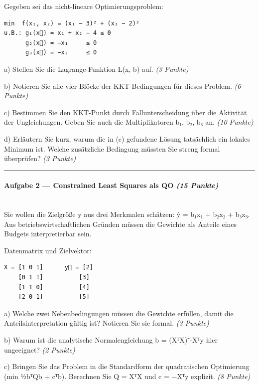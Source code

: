 \documentclass[11pt, a4paper]{article}
\begin{document}
Gegeben sei das nicht-lineare Optimierungsproblem:


\begin{lstlisting}
min  f(x₁, x₂) = (x₁ − 3)² + (x₂ − 2)²
u.B.: g₁(x⃗) = x₁ + x₂ − 4 ≤ 0
      g₂(x⃗) = −x₁     ≤ 0
      g₃(x⃗) = −x₂     ≤ 0
\end{lstlisting}


a) Stellen Sie die Lagrange-Funktion L(x⃗, b⃗) auf. \textit{(3 Punkte)}


b) Notieren Sie alle vier Blöcke der KKT-Bedingungen für dieses Problem. \textit{(6 Punkte)}


c) Bestimmen Sie den KKT-Punkt durch Fallunterscheidung über die Aktivität der Ungleichungen. Geben Sie auch die Multiplikatoren b₁, b₂, b₃ an. \textit{(10 Punkte)}


d) Erläutern Sie kurz, warum die in (c) gefundene Lösung tatsächlich ein lokales Minimum ist. Welche zusätzliche Bedingung müssten Sie streng formal überprüfen? \textit{(3 Punkte)}



\noindent\textcolor{rulegray}{\rule{\linewidth}{0.4pt}}


\paragraph{Aufgabe 2 — Constrained Least Squares als QO \textit{(15 Punkte)}}\mbox{}\\[2pt]

Sie wollen die Zielgröße y aus drei Merkmalen schätzen: ŷ = b₁x₁ + b₂x₂ + b₃x₃. Aus betriebswirtschaftlichen Gründen müssen die Gewichte als Anteile eines Budgets interpretierbar sein.


Datenmatrix und Zielvektor:


\begin{lstlisting}
X = [1 0 1]      y⃗ = [2]
    [0 1 1]          [3]
    [1 1 0]          [4]
    [2 0 1]          [5]
\end{lstlisting}


a) Welche zwei Nebenbedingungen müssen die Gewichte erfüllen, damit die Anteilsinterpretation gültig ist? Notieren Sie sie formal. \textit{(3 Punkte)}


b) Warum ist die analytische Normalengleichung b⃗ = (XᵀX)⁻¹Xᵀy⃗ hier ungeeignet? \textit{(2 Punkte)}


c) Bringen Sie das Problem in die Standardform der quadratischen Optimierung (min ½b⃗ᵀQb⃗ + c⃗ᵀb⃗). Berechnen Sie Q = XᵀX und c⃗ = −Xᵀy⃗ explizit. \textit{(8 Punkte)}
\end{document}

